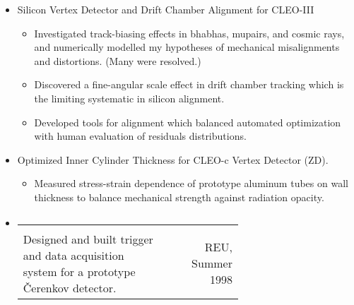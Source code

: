 \documentclass[12pt]{article}
\begin{document}
\begin{itemize}
\begin{itemize}
\end{itemize}

  \item Silicon Vertex Detector and Drift Chamber Alignment for CLEO-III

\begin{itemize}

  \item Investigated track-biasing effects in bhabhas, mupairs, and
    cosmic rays, and numerically modelled my hypotheses of mechanical
    misalignments and distortions.  (Many were resolved.)

  \item Discovered a fine-angular scale effect in drift chamber
    tracking which is the limiting systematic in silicon alignment.

  \item Developed tools for alignment which balanced automated
    optimization with human evaluation of residuals distributions.



\end{itemize}

  \item Optimized Inner Cylinder Thickness for CLEO-c Vertex Detector (ZD).

\begin{itemize}

  \item Measured stress-strain dependence of prototype aluminum tubes
    on wall thickness to balance mechanical strength against radiation
    opacity.

\end{itemize}

  \item \hspace{-0.35 cm} \begin{tabular}{p{0.65\linewidth} r} \mbox{\hspace{0.45\linewidth}} & \mbox{\hspace{0.328\linewidth}} \\
Designed and built trigger and data acquisition system for a prototype \v Cerenkov detector. & REU, Summer 1998 \end{tabular}


\end{itemize}
\end{document}
